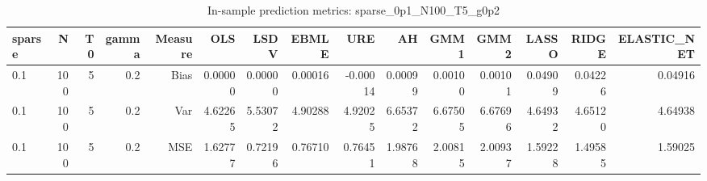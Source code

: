 \begin{table}[!htbp]\centering
\caption{In-sample prediction metrics: sparse_0p1_N100_T5_g0p2}
\label{tab:table2_sparse_0p1_N100_T5_g0p2}
\begin{tabular}{lrrrrrrrrrrrrrr}
\hline
sparse & N & T0 & gamma & Measure & OLS & LSDV & EBMLE & URE & AH & GMM1 & GMM2 & LASSO & RIDGE & ELASTIC_NET \\
\hline
0.1 & 100 & 5 & 0.2 & Bias & 0.00000 & 0.00000 & 0.00016 & -0.00014 & 0.00099 & 0.00100 & 0.00101 & 0.04909 & 0.04226 & 0.04916 \\
0.1 & 100 & 5 & 0.2 & Var & 4.62265 & 5.53072 & 4.90288 & 4.92025 & 6.65372 & 6.67505 & 6.67696 & 4.64932 & 4.65120 & 4.64938 \\
0.1 & 100 & 5 & 0.2 & MSE & 1.62777 & 0.72196 & 0.76710 & 0.76451 & 1.98768 & 2.00815 & 2.00937 & 1.59228 & 1.49585 & 1.59025 \\
\hline
\end{tabular}
\end{table}

